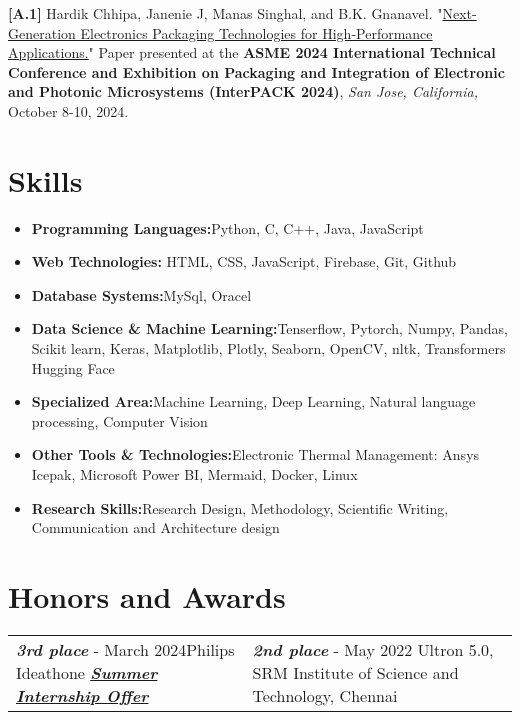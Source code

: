 \documentclass[a4paper,11pt]{article}
\newcommand{\resumeItem}[2]{
  \item{
    \textbf{#1}{\hspace{0.5mm}#2 \vspace{-0.5mm}}
  }
}
\newcommand{\resumeSubItem}[2]{\resumeItem{#1}{#2}\vspace{-4pt}}
\newcommand{\resumeHeadingSkillStart}{\begin{itemize}[leftmargin=*,itemsep=1.7mm, rightmargin=2ex]}
\newcommand{\resumeHeadingSkillEnd}{\end{itemize}\vspace{-2mm}}
\begin{document}
\item[\textbf{[A.1]}] Hardik Chhipa, Janenie J, Manas Singhal, and B.K. Gnanavel. "\href{https://drive.google.com/file/d/1aLORR9w4USbcnctFBxFVzvf-Fedswtaq/view?usp=sharing}{Next-Generation Electronics Packaging Technologies for High-Performance Applications.}" Paper presented at the \textbf{ASME 2024 International Technical Conference and Exhibition on Packaging and Integration of Electronic and Photonic Microsystems (InterPACK 2024)}, \textit{San Jose, California,} October 8-10, 2024. 


\section*{\hspace{-3em}\textbf{Skills}} 
\vspace{-0.4mm}
 \resumeHeadingSkillStart
  \resumeSubItem{Programming Languages:}
    {Python, C, C++, Java, JavaScript}
  \resumeSubItem{Web Technologies:}
    { HTML, CSS, JavaScript, Firebase, Git, Github}
  \resumeSubItem{Database Systems:}
    {MySql, Oracel}
  \resumeSubItem{Data Science \& Machine Learning:}
    {Tenserflow, Pytorch, Numpy, Pandas, Scikit learn, Keras, Matplotlib, Plotly, Seaborn, OpenCV, nltk, Transformers Hugging Face}
  \resumeSubItem{Specialized Area:}
    {Machine Learning, Deep Learning, Natural language processing, Computer Vision}
  \resumeSubItem{Other Tools \& Technologies:}
    {Electronic Thermal Management: Ansys Icepak, Microsoft Power BI, Mermaid, Docker, Linux}
  \resumeSubItem{Research Skills:}{Research Design, Methodology, Scientific Writing, Communication and Architecture design}
 \resumeHeadingSkillEnd

\section*{\hspace{-3em}\textbf{Honors and Awards}}
\vspace{-0.4mm}
\begin{tabular}{p{} p{}}
\textbf{\textit{3rd place}} - March 2024\newline \hspace{10mm}Philips Ideathone \newline \hspace{10mm}\textbf{\textit{\href{https://www.linkedin.com/feed/update/urn:li:activity:7171887717646024705/}{Summer Internship Offer}}} & \textbf{\textit{2nd place}} - May 2022 \newline \hspace{5mm}Ultron 5.0, \newline \hspace{5mm}SRM Institute of Science and Technology, Chennai \\
\end{tabular}
\end{document}
